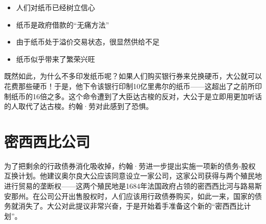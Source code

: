 \documentclass[12pt,oneside]{book}
\begin{document}
\begin{mdframed}
\begin{itemize}
\item 人们对纸币已经树立信心
\item 纸币是政府借款的“无痛方法”
\item 由于纸币处于溢价交易状态，很显然供给不足
\item 纸币似乎带来了繁荣兴旺
\end{itemize}

既然如此，为什么不多印发纸币呢？如果人们购买银行券来兑换硬币，大公就可以花费那些硬币！于是，他下令该银行印制10亿里弗尔的纸币——这超出了之前所印制纸币的16倍之多。这个命令遭到了大臣达古梭的反对，大公于是立即用更加听话的人取代了达古梭。约翰·劳对此感到了恐惧。
\end{mdframed}


\section{密西西比公司}
为了把剩余的行政债券消化吸收掉，约翰·劳进一步提出实施一项新的债务-股权互换计划。他建议奥尔良大公应该同意设立一家公司，这家公司获得与两个殖民地进行贸易的垄断权——这两个殖民地是1684年法国政府占领的密西西比河与路易斯安那州。在公司公开出售股权时，人们应该用行政债券购买，如此一来，国家的债务就消失了。大公对此提议非常兴奋，于是开始着手准备这个新的“密西西比计划”。
\end{document}
